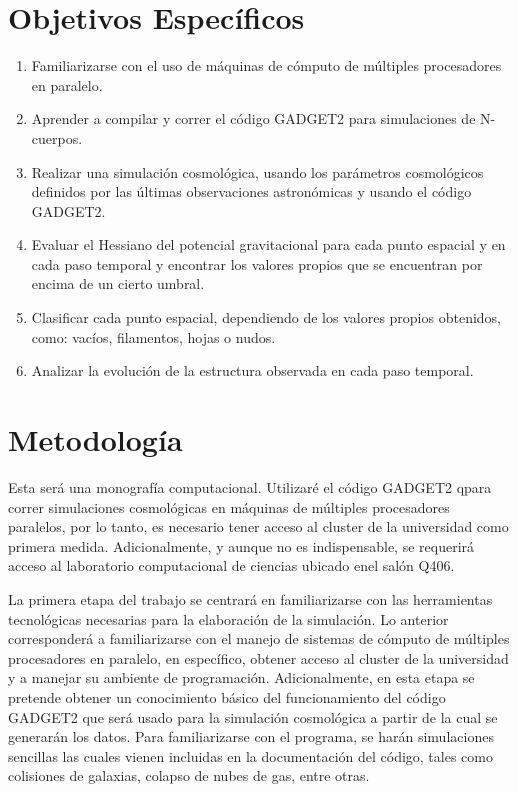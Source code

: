 \documentclass{article}
\begin{document}
\section{Objetivos Específicos}

\begin{enumerate}

\item Familiarizarse con el uso de máquinas de c\'omputo de múltiples
  procesadores en paralelo.  
\item Aprender a compilar y correr el código GADGET2 para simulaciones
  de N-cuerpos. 
\item Realizar una simulación cosmológica, usando los parámetros
  cosmológicos definidos por las últimas observaciones astronómicas y
  usando el código GADGET2. 
\item Evaluar el Hessiano del potencial gravitacional para cada punto
  espacial y en cada paso temporal y encontrar los valores propios que
  se encuentran por encima de un cierto umbral. 
\item Clasificar cada punto espacial, dependiendo de los valores
  propios obtenidos, como: vacíos, filamentos, hojas o nudos. 
\item Analizar la evolución de la estructura observada en cada paso
  temporal. 
\end{enumerate}


\section{Metodología}

Esta será una monografía computacional. Utilizar\'e el código
GADGET2 qpara correr simulaciones cosmológicas en máquinas de
múltiples procesadores paralelos, por lo tanto, es necesario tener
acceso al cluster de la universidad como primera
medida. Adicionalmente, y aunque no es indispensable, se requerirá
acceso al laboratorio computacional de ciencias ubicado enel salón
Q406.  
  
La primera etapa del trabajo se centrará en familiarizarse con las
herramientas tecnológicas necesarias para la elaboración de la
simulación. Lo anterior corresponderá a familiarizarse con el manejo
de sistemas de cómputo de múltiples procesadores en paralelo, en
específico, obtener acceso al cluster de la universidad y a manejar su
ambiente de programación. Adicionalmente, en esta etapa se pretende
obtener un conocimiento básico del funcionamiento del código GADGET2
que será usado para la simulación cosmológica a partir de la cual se
generarán los datos. Para familiarizarse con el programa, se harán
simulaciones sencillas las cuales vienen incluidas en la documentación
del código, tales como colisiones de galaxias, colapso de nubes de
gas, entre otras.  
\end{document}
